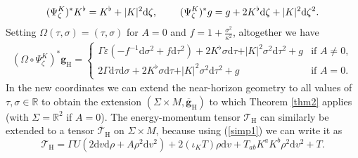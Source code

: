 \documentclass[11pt, reqno]{amsart}
\newcommand{\R}{\mathbb{R}}
\theoremstyle{plain}
\theoremstyle{definition}
\numberwithin{equation}{section}
\begin{document}
\begin{equation} \label{comp}
    (\Psi^K_\zeta)^* K^\flat  = K^\flat + \vert K \vert^2\text{d}\zeta, \hspace{.8cm}(\Psi^K_\zeta)^* g = g + 2K^\flat \text{d}\zeta + \vert K \vert^2 \text{d}\zeta^2.
\end{equation}
Setting $\Omega(\tau,\sigma) = (\tau,\sigma)$ for $A = 0$ and $f = 1 + \frac{\sigma^2}{\kappa^2}$, altogether we have
\begin{align}
    (\Omega \circ \Psi_\zeta^K)^*\textbf{g}_{\text{H}} = \begin{cases}
        \Gamma\varepsilon\left(-f^{-1}\text{d}\sigma^2 +f\text{d}\tau^2\right)  + 2K^\flat\sigma\text{d}\tau + \vert K \vert^2 \sigma^2\text{d}\tau^2 + g &\text{if   } A \neq 0, \\[5pt]
        2\Gamma\text{d}\tau\text{d}\sigma + 2K^\flat \sigma\text{d}\tau + \vert K \vert^2 \sigma^2\text{d}\tau^2 + g &\text{if   } A =0.
    \end{cases}
\end{align}
In the new coordinates we can extend the near-horizon geometry to all values of $\tau, \sigma \in \R$ to obtain the extension $(\Sigma \times M,\overline{\textbf{g}}_{\text{H}})$ to which Theorem \ref{thm2} applies (with $\Sigma = \mathbb{R}^2$ if $A = 0$).  The energy-momentum tensor $\mathcal{T}_{\text{H}}$ can similarly be extended to a tensor $\overline{\mathcal{T}}_{\text{H}}$ on $\Sigma \times M$, because using (\ref{simp1}) we can write it as
\begin{equation} \label{Tenh}
    \mathcal{T}_{\text{H}} = \Gamma U(2\text{d}v\text{d}\rho + A\rho^2\text{d}v^2) + 2(\iota_K T) \rho\text{d}v + T_{ab}K^aK^b\rho^2\text{d}v^2 + T.
\end{equation}
\end{document}
